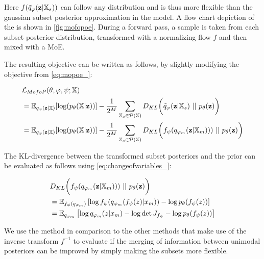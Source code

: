 Here $f(\tilde{q}_{\varphi}(\textbf{z}|\mathbb{X}_s))$ can follow any distribution and is thus more flexible than the gaussian subset posterior approximation in the  model.
A flow chart depiction of the  is shown in \cref{fig:mofopoe}.
During a forward pass, a sample is taken from each subset posterior distribution, transformed with a normalizing flow $f$ and then mixed with a MoE.

The resulting objective can be written as follows, by slightly modifying the  objective from \cref{eq:mopoe_}:

\begin{equation}
    \begin{split}
        &\mathcal{L}_{\mg{MofoP}}(\theta, \phi, \psi; \xset)\\
        &=  \mathbb{E}_{q_{\phi}(\textbf{z}|\mathbb{X})}[\log (p_{\theta}(\mathbb{X}|\textbf{z}))] - \frac{1}{2^M} \sum _{\mathbb{X}_s \in \mathcal{P}(\mathbb{X})} D_{KL}\biggl( \tilde{q}_{\phi}(\textbf{z}|\mathbb{X}_s)\ ||\ p_{\theta}(\textbf{z})\biggr)\\
        &= \mathbb{E}_{q_{\phi}(\textbf{z}|\mathbb{X})}[\log (p_{\theta}(\mathbb{X}|\textbf{z}))] - \frac{1}{2^M} \sum _{\mathbb{X}_s \in \mathcal{P}(\mathbb{X})} D_{KL}\biggl( f_{\psi} (\unimodalpost))\ ||\ p_{\theta}(\textbf{z})\biggr)
    \end{split}
\end{equation}

The KL-divergence between the transformed subset posteriors and the prior can be evaluated as follows using \cref{eq:changeofvariables_}:

\begin{equation}
    \begin{split}
        &D_{KL}\biggl( f_{\psi} (\unimodalpost))\ ||\ p_{\theta}(\textbf{z})\biggr)\\
        &= \mathbb{E}_{f_{\psi}(q_{\phi_m})} \left[ \log  f_{\psi} (q_{\phi_m}(f_{\psi}(z)|x_m)) - \log p_{\theta}(f_{\psi}(z))   \right]\\
        &= \mathbb{E}_{q_{\phi_m}} \left[ \log  q_{\phi_m}(z|x_m) - \log \det J_{f_{\psi}} - \log p_{\theta}(f_{\psi}(z))   \right]\\
    \end{split}
\end{equation}

We use the  method in comparison to the other methods that make use of the inverse transform $f^{-1}$ to evaluate if the merging of information between unimodal posteriors can be improved by simply making the subsets more flexible. %

